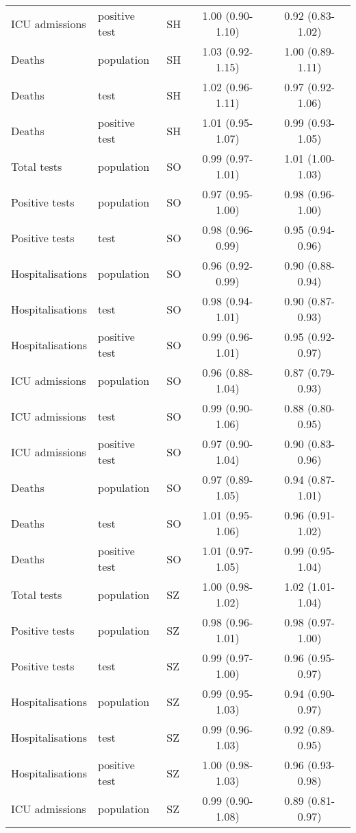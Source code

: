 \documentclass{article}
\begin{document}
\begin{longtable}{lllcc}
		ICU admissions & positive test & SH & 1.00 (0.90-1.10) & 0.92 (0.83-1.02) \\ 
		Deaths & population & SH & 1.03 (0.92-1.15) & 1.00 (0.89-1.11) \\ 
		Deaths & test & SH & 1.02 (0.96-1.11) & 0.97 (0.92-1.06) \\ 
		Deaths & positive test & SH & 1.01 (0.95-1.07) & 0.99 (0.93-1.05) \\ 
		Total tests & population & SO & 0.99 (0.97-1.01) & 1.01 (1.00-1.03) \\ 
		Positive tests & population & SO & 0.97 (0.95-1.00) & 0.98 (0.96-1.00) \\ 
		Positive tests & test & SO & 0.98 (0.96-0.99) & 0.95 (0.94-0.96) \\ 
		Hospitalisations & population & SO & 0.96 (0.92-0.99) & 0.90 (0.88-0.94) \\ 
		Hospitalisations & test & SO & 0.98 (0.94-1.01) & 0.90 (0.87-0.93) \\ 
		Hospitalisations & positive test & SO & 0.99 (0.96-1.01) & 0.95 (0.92-0.97) \\ 
		ICU admissions & population & SO & 0.96 (0.88-1.04) & 0.87 (0.79-0.93) \\ 
		ICU admissions & test & SO & 0.99 (0.90-1.06) & 0.88 (0.80-0.95) \\ 
		ICU admissions & positive test & SO & 0.97 (0.90-1.04) & 0.90 (0.83-0.96) \\ 
		Deaths & population & SO & 0.97 (0.89-1.05) & 0.94 (0.87-1.01) \\ 
		Deaths & test & SO & 1.01 (0.95-1.06) & 0.96 (0.91-1.02) \\ 
		Deaths & positive test & SO & 1.01 (0.97-1.05) & 0.99 (0.95-1.04) \\ 
		Total tests & population & SZ & 1.00 (0.98-1.02) & 1.02 (1.01-1.04) \\ 
		Positive tests & population & SZ & 0.98 (0.96-1.01) & 0.98 (0.97-1.00) \\ 
		Positive tests & test & SZ & 0.99 (0.97-1.00) & 0.96 (0.95-0.97) \\ 
		Hospitalisations & population & SZ & 0.99 (0.95-1.03) & 0.94 (0.90-0.97) \\ 
		Hospitalisations & test & SZ & 0.99 (0.96-1.03) & 0.92 (0.89-0.95) \\ 
		Hospitalisations & positive test & SZ & 1.00 (0.98-1.03) & 0.96 (0.93-0.98) \\ 
		ICU admissions & population & SZ & 0.99 (0.90-1.08) & 0.89 (0.81-0.97) \\ 

\end{longtable}
\end{document}
